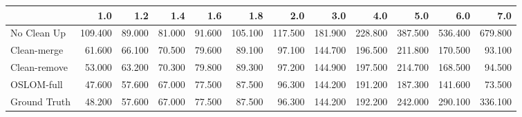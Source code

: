 \begin{tabular}{lrrrrrrrrrrr}
\toprule
{} &     1.0 &    1.2 &    1.4 &    1.6 &     1.8 &     2.0 &     3.0 &     4.0 &     5.0 &     6.0 &     7.0 \\
\midrule
No Clean Up  & 109.400 & 89.000 & 81.000 & 91.600 & 105.100 & 117.500 & 181.900 & 228.800 & 387.500 & 536.400 & 679.800 \\
Clean-merge  &  61.600 & 66.100 & 70.500 & 79.600 &  89.100 &  97.100 & 144.700 & 196.500 & 211.800 & 170.500 &  93.100 \\
Clean-remove &  53.000 & 63.200 & 70.300 & 79.800 &  89.300 &  97.200 & 144.900 & 197.500 & 214.700 & 168.500 &  94.500 \\
OSLOM-full   &  47.600 & 57.600 & 67.000 & 77.500 &  87.500 &  96.300 & 144.200 & 191.200 & 187.300 & 141.600 &  73.500 \\
Ground Truth &  48.200 & 57.600 & 67.000 & 77.500 &  87.500 &  96.300 & 144.200 & 192.200 & 242.000 & 290.100 & 336.100 \\
\bottomrule
\end{tabular}
